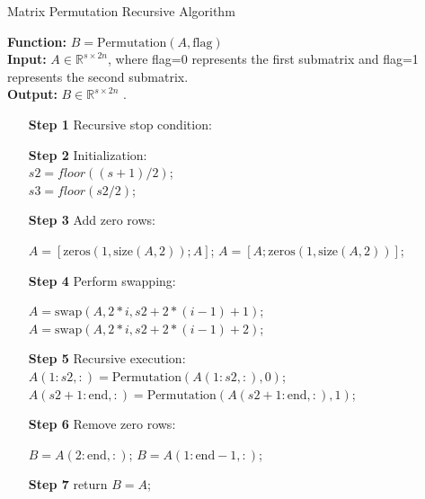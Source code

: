 \documentclass[1p]{elsarticle}
\numberwithin{equation}{section}
\begin{document}
\begin{algorithm}[htbp]
    \caption{Matrix Permutation Recursive Algorithm} \label{alg:Permutation}
    \textbf{Function:} $B=\text{Permutation}(A,\text{flag})$\\	
    \textbf{Input:}  $ A \in \mathbb{R}^{s \times 2n}$, where flag=0 represents the first submatrix and flag=1 represents the second submatrix.\\
    \textbf{Output:} $B \in \mathbb{R}^{s \times 2n}$ .
\begin{itemize}
    \item[\textbf{Step 1}] Recursive stop condition:
\begin{algorithmic}[0]
        \EndIf
\end{algorithmic}
    \item[\textbf{Step 2}] Initialization: \\
       $s2 = floor((s+1)/2)$; \\
       $s3 = floor(s2/2)$;
    \item[\textbf{Step 3}] Add zero rows:
\begin{algorithmic}[0]
                \State $A = [\text{zeros}(1, \text{size}(A, 2)); A]$;
            \Else 
                \State $A = [A; \text{zeros}(1, \text{size}(A, 2))]$;
            \EndIf
        \EndIf
\end{algorithmic}
    \item[\textbf{Step 4}] Perform swapping:
\begin{algorithmic}[0]
                \State $A= \text{swap}(A,2*i,s2+2*(i-1)+1)$;
            \Else 
                \State $A= \text{swap}(A,2*i,s2+2*(i-1)+2)$;
            \EndIf
        \EndFor
\end{algorithmic}
    \item[\textbf{Step 5}] Recursive execution: \\
       $A(1:s2, :) = \text{Permutation}(A(1:s2, :), 0)$; \\
       $A(s2+1:\text{end}, :) = \text{Permutation}(A(s2+1:\text{end}, :), 1)$;
    \item[\textbf{Step 6}] Remove zero rows:
\begin{algorithmic}[0]
         \State $B = A(2:\text{end}, :)$;
        \Else \State $B = A(1:\text{end}-1, :)$;
        \EndIf
    \EndIf
\end{algorithmic}
    \item[\textbf{Step 7}] return $B=A$;
\end{itemize}
\end{algorithm}
\end{document}
